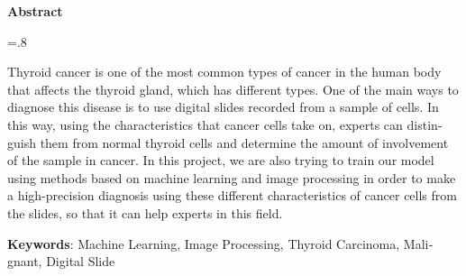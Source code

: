 


\pagestyle{empty}

\begin{latin}

\begin{center}
\textbf{Abstract}
\end{center}
\baselineskip=.8\baselineskip

Thyroid cancer is one of the most common types of cancer in the human body that affects the thyroid gland, which has different types.
One of the main ways to diagnose this disease is to use digital slides recorded from a sample of cells.
In this way, using the characteristics that cancer cells take on, experts can distinguish them from normal thyroid cells and determine the amount of involvement of the sample in cancer.
In this project, we are also trying to train our model using methods based on machine learning and image processing in order to make a high-precision diagnosis using these different characteristics of cancer cells from the slides, so that it can help experts in this field.



\bigskip\noindent\textbf{Keywords}:
Machine Learning, Image Processing, Thyroid Carcinoma, Malignant, Digital Slide

\end{latin}

\newpage
